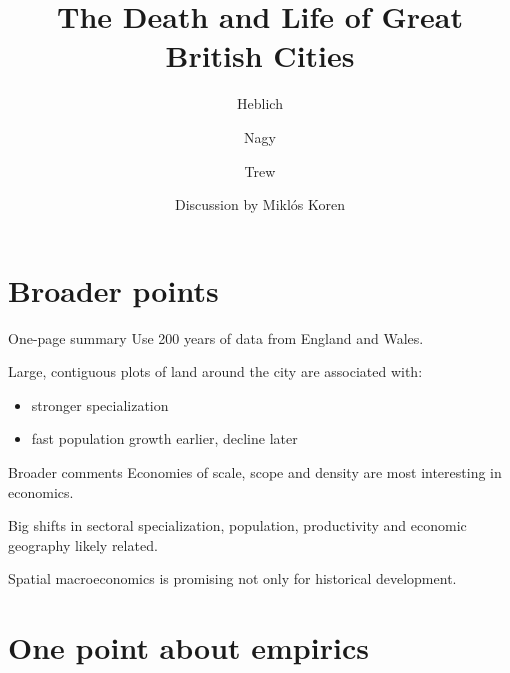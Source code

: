 \documentclass[
  ignorenonframetext,
  aspectratio=16,
]{beamer}
\title{The Death and Life of Great British Cities}
\author{Heblich \and Nagy \and Trew}
\date{Discussion by Miklós Koren}
\providecommand{\tightlist}{%
  \setlength{\itemsep}{0pt}\setlength{\parskip}{0pt}}
\begin{document}
\frame{\titlepage}

\hypertarget{broader-points}{%
\section{Broader points}\label{broader-points}}

\begin{frame}{One-page summary}
\protect\hypertarget{one-page-summary}{}
Use 200 years of data from England and Wales.

Large, contiguous plots of land around the city are associated with:

\begin{itemize}
\tightlist
\item
  stronger specialization
\item
  fast population growth earlier, decline later
\end{itemize}
\end{frame}

\begin{frame}{Broader comments}
\protect\hypertarget{broader-comments}{}
Economies of scale, scope and density are most interesting in economics.

Big shifts in sectoral specialization, population, productivity and
economic geography likely related.

Spatial macroeconomics is promising not only for historical development.
\end{frame}

\hypertarget{one-point-about-empirics}{%
\section{One point about empirics}\label{one-point-about-empirics}}
\end{document}
